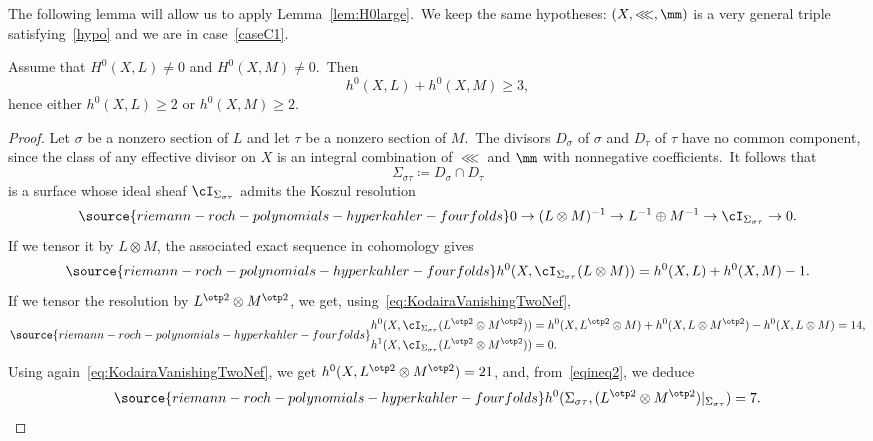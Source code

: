 The following lemma will allow  us to apply Lemma~\ref{lem:H0large}.\ We keep the same hypotheses: $(X,\lll,\mm)$ is a very   general triple satisfying~\eqref{hypo} and we are in case~\ref{caseC1}.

\begin{lemm}\label{lecasholhoM}
Assume that $H^0(X,L)\ne 0$ and $H^0(X,M)\ne 0$.\
Then
\begin{equation*}
h^0(X,L)+h^0(X,M)\geq 3,
\end{equation*}
hence either $h^0(X,L)\geq 2$ or $h^0(X,M)\geq2$.
\end{lemm}

\begin{proof}
Let $\sigma$ be a nonzero section of $L$ and let $\tau$ be a nonzero section of $M$.\
The divisors $D_\sigma$ of $\sigma$ and $D_\tau$ of $\tau$   have no common component, since the class of any effective divisor on $X$ is an integral combination of $\lll$ and $\mm$ with nonnegative coefficients.\
It follows that
\[
\Sigma_{\sigma\tau}\coloneqq D_\sigma\cap D_\tau
\]
is a surface whose ideal sheaf $\cI_{\Sigma_{\sigma\tau}}$ admits the Koszul resolution
\begin{equation*}\label{eqkosresSigma}
\source{riemann-roch-polynomials-hyperkahler-fourfolds}
0\to  (L\otimes M)^{-1}\to    L^{-1}\oplus  M^{-1}\to   \cI_{\Sigma_{\sigma\tau}} \to  0.
\end{equation*}
If we tensor it by $L\otimes M$, the associated  exact sequence in cohomology gives
\begin{equation}\label{eqineq1}
\source{riemann-roch-polynomials-hyperkahler-fourfolds}
h^0(X,\cI_{\Sigma_{\sigma\tau}}(L\otimes M))=h^0(X,L)+h^0(X,M)-1.
\end{equation}
If we tensor the resolution by $L^{\otp 2}\otimes M^{\otp 2}$, we get, using~\eqref{eq:KodairaVanishingTwoNef},
\begin{equation}\label{eqineq2}
\source{riemann-roch-polynomials-hyperkahler-fourfolds}
\begin{split}
h^0(X,\cI_{\Sigma_{\sigma\tau}}(L^{\otp 2}\otimes M^{\otp 2}))&=h^0(X,L^{\otp 2}\otimes M)+h^0(X,L\otimes M^{\otp 2})-h^0(X,L\otimes M )=14,\\ h^1(X,\cI_{\Sigma_{\sigma\tau}}(L^{\otp 2}\otimes M^{\otp 2}))&=0.
\end{split}
\end{equation}
Using again~\eqref{eq:KodairaVanishingTwoNef}, we get $h^0(X,L^{\otp 2}\otimes M^{\otp 2})=21$, and, from~\eqref{eqineq2}, we deduce
\begin{equation}\label{eqineq3}
\source{riemann-roch-polynomials-hyperkahler-fourfolds}
h^0(\Sigma_{\sigma\tau},(L^{\otp 2}\otimes M^{\otp 2})\vert_{\Sigma_{\sigma\tau}})=7.
\end{equation}


\end{proof}
